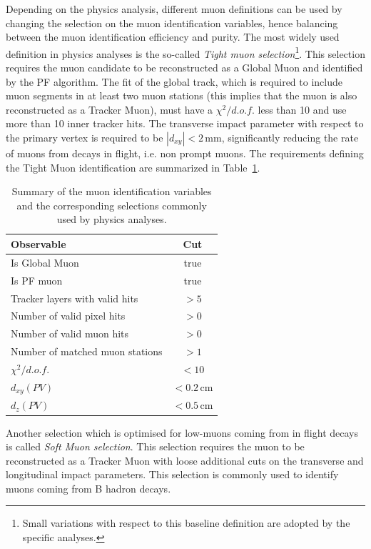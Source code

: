 Depending on the physics analysis, different muon definitions can be used by changing the selection on the muon identification variables, hence balancing between the muon identification efficiency and purity. The most widely used definition in physics analyses is the so-called \emph{Tight muon selection}\footnote{Small variations with respect to this baseline definition are adopted by the specific analyses.}. This selection requires the muon candidate to be reconstructed as a Global Muon and identified by the PF algorithm. The fit of the global track, which is required to include muon segments in at least two muon stations (this implies that the muon is also reconstructed as a Tracker Muon), must have a $\chi^2/d.o.f.$ less than 10 and use more than 10 inner tracker hits. The transverse impact parameter with respect to the primary vertex is required to be $|d_{xy}|<2$\,mm, significantly reducing the rate of muons from decays in flight, i.e. non prompt muons. The requirements defining the Tight Muon identification are summarized in Table~\ref{tab:tightmuon}.

\begin{table}[htb]
\caption{Summary of the muon identification variables and the corresponding selections commonly used by physics analyses.}\label{tab:tightmuon}
\centering
\begin{tabular}{lc}
\toprule
Observable & Cut \\
\midrule
Is Global Muon & true \\
Is PF muon & true \\
Tracker layers with valid hits & $>5$ \\
Number of valid pixel hits & $>0$ \\
Number of valid muon hits & $>0$ \\
Number of matched muon stations & $>1$ \\
$\chi^2/d.o.f.$ & $<10$ \\
$d_{xy}(PV)$ & $< 0.2$\,cm \\
$d_{z}(PV)$ & $< 0.5$\,cm \\
\bottomrule
\end{tabular}
\end{table}

Another selection which is optimised for low-\pt muons coming from in flight decays is called \emph{Soft Muon selection}. This selection requires the muon to be reconstructed as a Tracker Muon with loose additional cuts on the transverse and longitudinal impact parameters. This selection is commonly used to identify muons coming from B hadron decays.

